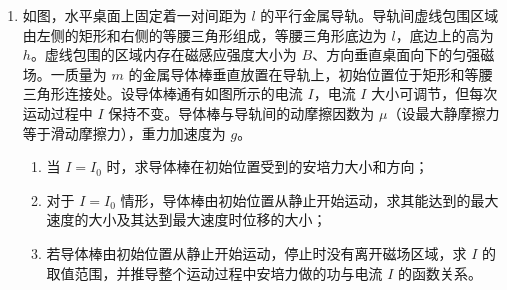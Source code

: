 \documentclass[\gkver]{gaokaozhenti}
\begin{document}
\begin{enumerate}
{所以消耗的能量为 $W = P_{\text{出}}t = 20400 \times \frac{100}{27} \times 3600\UJ = 2.72 \times 10^{8}\UJ$。

方案三中 $v = 120\Ukmh = \frac{100}{3}\Ums$，则由题可知 $\eta = 0.8$，此时有

\[ F' = F_{1} + F_{2} = k_{1}Mg + k_{2}v^{2} = 688\UN \]

电池输出功率 $P_{\text{出}}' = \frac{F'v}{\eta} = \frac{\frac{100}{3} \times 688}{0.8}\UW = \frac{344000}{12}\UW = \frac{86000}{3}\UW$，

整个过程行驶的时间 $t' = \frac{400}{120}\Uh = 12000\Us$，

所以消耗的能量为 $W' = P_{\text{出}}'t' = \frac{86000}{3} \times 12000\UJ = 3.44 \times 10^{8}\UJ$。

根据前面的计算可知电池的最大储能为 $E = 3.24 \times 10^{8}\UJ < 3.44 \times 10^{8}\UJ$，故方案三也不可行；所以应该选择方案二。
}
\item
如图，水平桌面上固定着一对间距为 $l$ 的平行金属导轨。导轨间虚线包围区域由左侧的矩形和右侧的等腰三角形组成，等腰三角形底边为 $l$，底边上的高为 $h$。虚线包围的区域内存在磁感应强度大小为 $B$、方向垂直桌面向下的匀强磁场。一质量为 $m$ 的金属导体棒垂直放置在导轨上，初始位置位于矩形和等腰三角形连接处。设导体棒通有如图所示的电流 $I$，电流 $I$ 大小可调节，但每次运动过程中 $I$ 保持不变。导体棒与导轨间的动摩擦因数为 $\mu$（设最大静摩擦力等于滑动摩擦力），重力加速度为 $g$。

\begin{enumerate}
	\item
	当 $I = I_{0}$ 时，求导体棒在初始位置受到的安培力大小和方向；
	\item
	对于 $I = I_{0}$ 情形，导体棒由初始位置从静止开始运动，求其能达到的最大速度的大小及其达到最大速度时位移的大小；
	\item
	若导体棒由初始位置从静止开始运动，停止时没有离开磁场区域，求 $I$ 的取值范围，并推导整个运动过程中安培力做的功与电流 $I$ 的函数关系。
\end{enumerate}

\onepicture[w=9.0cm, align=right]{}


\end{enumerate}
\end{document}
